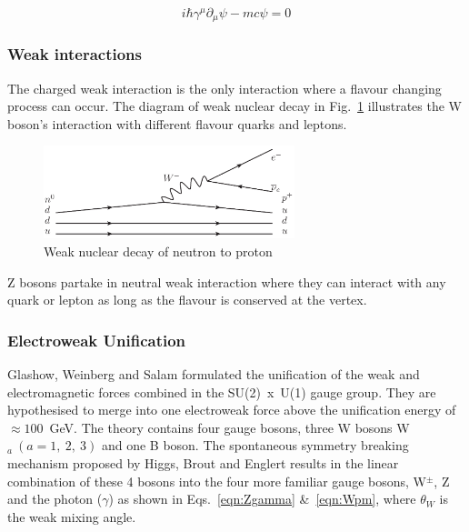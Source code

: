 \begin{equation}
i\hbar \gamma ^{\mu }\partial _{\mu }\psi -mc\psi =0
\label{Eqn:Dirac}
\end{equation}

\subsubsection{Weak interactions}

The charged weak interaction is the only interaction where a flavour changing process can occur. The diagram of weak nuclear decay in Fig.~\ref{fig:QEDvertex} illustrates the W boson's interaction with different flavour quarks and leptons.


\begin{figure}[ht!]
\begin{center}
    \includegraphics[width=0.65\textwidth]{images/Theory/weakDecay.png}
    \caption{Weak nuclear decay of neutron to proton}
    \label{fig:QEDvertex}
\end{center}
\end{figure}

Z bosons partake in neutral weak interaction where they can interact with any quark or lepton as long as the flavour is conserved at the vertex.

\subsubsection{Electroweak Unification}

Glashow, Weinberg and Salam formulated the unification of the weak and electromagnetic forces combined in the SU(2)~x~U(1) gauge group. They are hypothesised to merge into one electroweak force above the unification energy of $\approx 100$~GeV. The theory contains four gauge bosons, three W bosons W$_{a}~(a=1,~2,~3)$ and one B boson. The spontaneous symmetry breaking mechanism proposed by Higgs, Brout and Englert results in the linear combination of these 4 bosons into the four more familiar gauge bosons, W$^{\pm}$, Z and the photon ($\gamma$) as shown in Eqs.~\ref{eqn:Zgamma} \&~\ref{eqn:Wpm}, where $\theta_{W}$ is the weak mixing angle.

